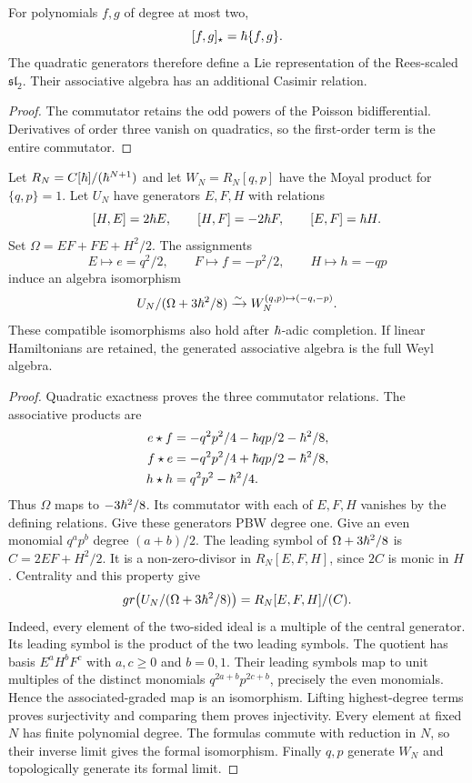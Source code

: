 \begin{theorem}
For polynomials $f,g$ of degree at most two,
\[
 [f,g]_\star=\hbar\{f,g\}.
\]
The quadratic generators therefore define a Lie representation of the Rees-scaled $\mathfrak{sl}_2$.  Their associative algebra has an additional Casimir relation.
\end{theorem}
\begin{proof}
The commutator retains the odd powers of the Poisson bidifferential.  Derivatives of order three vanish on quadratics, so the first-order term is the entire commutator.
\end{proof}

\begin{proposition}\label{prop:vol2-oscillator-quotient}
Let $R_N=C[\hbar]/(\hbar^{N+1})$ and let $W_N=R_N[q,p]$
have the Moyal product for $\{q,p\}=1$.
Let $U_N$ have generators $E,F,H$ with relations
\[
 [H,E]=2\hbar E,\qquad [H,F]=-2\hbar F,\qquad [E,F]=\hbar H.
\]
Set $\Omega=EF+FE+H^2/2$.
The assignments
\[
 E\longmapsto e=q^2/2,\qquad
 F\longmapsto f=-p^2/2,\qquad
 H\longmapsto h=-qp
\]
induce an algebra isomorphism
\[
 U_N/(\Omega+3\hbar^2/8)
 \xrightarrow{\sim} W_N^{(q,p)\mapsto(-q,-p)}.
\]
These compatible isomorphisms also hold after $\hbar$-adic completion.
If linear Hamiltonians are retained, the generated associative algebra is the full Weyl algebra.
\end{proposition}
\begin{proof}
Quadratic exactness proves the three commutator relations.
The associative products are
\[
\begin{split}
 e\star f&=-q^2p^2/4-\hbar qp/2-\hbar^2/8,\\
 f\star e&=-q^2p^2/4+\hbar qp/2-\hbar^2/8,\\
 h\star h&=q^2p^2-\hbar^2/4.
\end{split}
\]
Thus $\Omega$ maps to $-3\hbar^2/8$.
Its commutator with each of $E,F,H$ vanishes by the defining relations.
Give these generators PBW degree one.
Give an even monomial $q^ap^b$ degree $(a+b)/2$.
The leading symbol of $\Omega+3\hbar^2/8$ is
$C=2EF+H^2/2$.
It is a non-zero-divisor in $R_N[E,F,H]$, since $2C$ is monic in $H$.
Centrality and this property give
\[
 gr\bigl(U_N/(\Omega+3\hbar^2/8)\bigr)
 =R_N[E,F,H]/(C).
\]
Indeed, every element of the two-sided ideal is a multiple of the central generator.
Its leading symbol is the product of the two leading symbols.
The quotient has basis $E^aH^bF^c$ with $a,c\ge0$ and $b=0,1$.
Their leading symbols map to unit multiples of the distinct monomials
$q^{2a+b}p^{2c+b}$, precisely the even monomials.
Hence the associated-graded map is an isomorphism.
Lifting highest-degree terms proves surjectivity and comparing them proves injectivity.
Every element at fixed $N$ has finite polynomial degree.
The formulas commute with reduction in $N$, so their inverse limit gives the formal isomorphism.
Finally $q,p$ generate $W_N$ and topologically generate its formal limit.
\end{proof}

